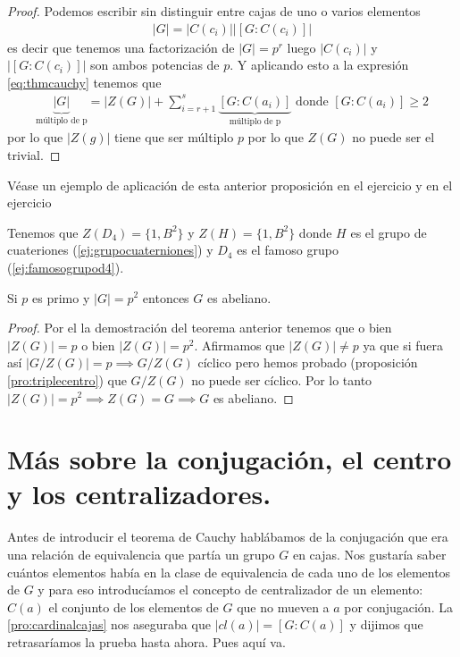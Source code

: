 \begin{proof}
	Podemos escribir sin distinguir entre cajas de uno o varios elementos
	\begin{align*}
	|G| = |C(c_i)||[G:C(c_i)]|
	\end{align*}
	es decir que tenemos una factorización de $|G| = p^r$ luego $|C(c_i)|$ y $|[G:C(c_i)]|$ son ambos potencias de $p$. Y aplicando esto a la expresión \ref{eq:thmcauchy} tenemos que
	\begin{align*}
	\underbrace{|G|}_{\text{múltiplo de p}} = |Z(G)| + \sum_{i = r + 1}^{s} \underbrace{[G : C(a_i)]}_{\text{múltiplo de p}} \text{ donde } [G : C(a_i)] \geq 2
	\end{align*}
	por lo que $|Z(g)|$ tiene que ser múltiplo $p$ por lo que $Z(G)$ no puede ser el trivial.
\end{proof}

Véase un ejemplo de aplicación de esta anterior proposición en el ejercicio  y en el ejercicio 

\begin{ej}
	Tenemos que $Z(D_4) = \{1,B^2\}$ y $Z(H) = \{1, B^2\}$ donde $H$ es el grupo de cuateriones (\autoref{ej:grupocuaterniones}) y $D_4$ es el famoso grupo (\autoref{ej:famosogrupod4}).
\end{ej}

\begin{pro}
	\label{pro:primocuadradoabeliano}
	Si $p$ es primo y $|G| = p^2$ entonces $G$ es abeliano.
\end{pro}

\begin{proof}
	Por el la demostración del teorema anterior tenemos que o bien $|Z(G)| = p$ o bien $|Z(G)| = p^2$. Afirmamos que $|Z(G)| \neq p$ ya que si fuera así $|G/Z(G)| = p \implies G/Z(G)$ cíclico pero hemos probado (proposición \ref{pro:triplecentro}) que $G/Z(G)$ no puede ser cíclico. Por lo tanto $|Z(G)| = p^2 \implies Z(G) = G \implies G$ es abeliano.
\end{proof}


\section{Más sobre la conjugación, el centro y los centralizadores.}
Antes de introducir el teorema de Cauchy hablábamos de la conjugación que era una relación de equivalencia que partía un grupo $G$ en cajas. Nos gustaría saber cuántos elementos había en la clase de equivalencia de cada uno de los elementos de $G$ y para eso introducíamos el concepto de centralizador de un elemento: $C(a)$ el conjunto de los elementos de $G$ que no mueven a $a$ por conjugación. La \autoref{pro:cardinalcajas} nos aseguraba que $|cl(a)| = [G:C(a)]$ y dijimos que retrasaríamos la prueba hasta ahora. Pues aquí va.




